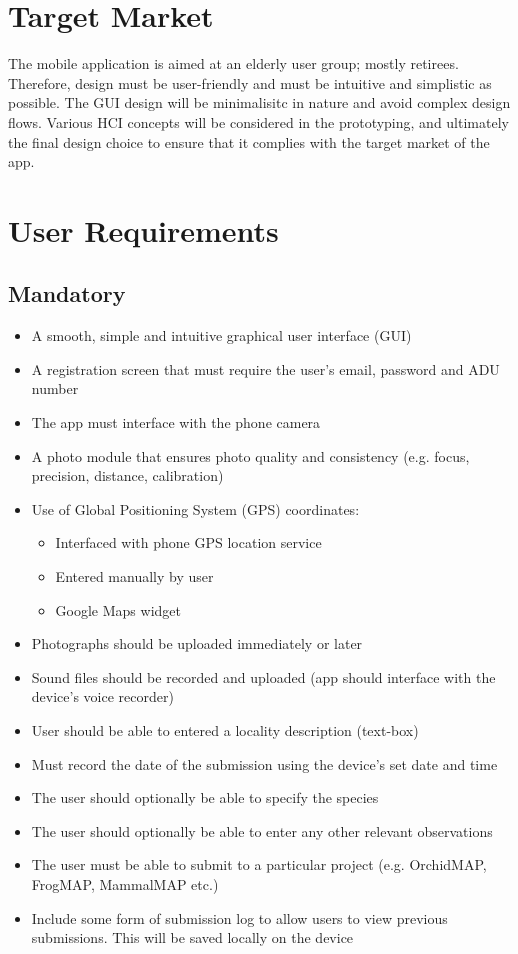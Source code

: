 \documentclass[12pt,a4paper,oneside]{report}
\begin{document}
\section{Target Market}
  \begin{spacing}{1.4}
    The mobile application is aimed at an elderly user group; mostly retirees. Therefore, design must be user-friendly and must be intuitive and simplistic as possible. The GUI design will be minimalisitc in nature and avoid complex design flows. Various HCI concepts will be considered in the prototyping, and ultimately the final design choice to ensure that it complies with the target market of the app.
  \end{spacing}

\section{User Requirements}
\subsection{Mandatory}
    \begin{itemize}
      \item A smooth, simple and intuitive graphical user interface (GUI)
      \item A registration screen that must require the user's email, password and ADU number
      \item The app must interface with the phone camera
      \item A photo module that ensures photo quality and consistency (e.g. focus, precision, distance, calibration)
      \item Use of Global Positioning System (GPS) coordinates:
        \begin{itemize}
          \item Interfaced with phone GPS location service
          \item Entered manually by user
          \item Google Maps widget
        \end{itemize}
      \item Photographs should be uploaded immediately or later
      \item Sound files should be recorded and uploaded (app should interface with the device's voice recorder)
      \item User should be able to entered a locality description (text-box)
      \item Must record the date of the submission using the device's set date and time
      \item The user should optionally be able to specify the species
      \item The user should optionally be able to enter any other relevant observations
      \item The user must be able to submit to a particular project (e.g. OrchidMAP, FrogMAP, MammalMAP etc.)
      \item Include some form of submission log to allow users to view previous submissions. This will be saved locally on the device
    \end{itemize}
\end{document}
